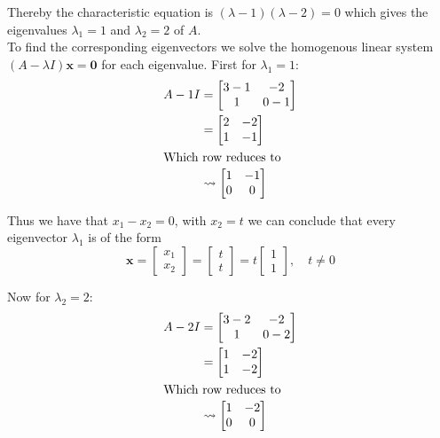 Thereby the characteristic equation is $(\lambda - 1)(\lambda - 2) = 0$ which gives the eigenvalues $\lambda_1 = 1$ and $\lambda_2 = 2$ of $A$.\\[2ex]
To find the corresponding eigenvectors we solve the homogenous linear system $(A-\lambda I)\mathbf{x}=\mathbf{0}$ for each eigenvalue. First for $\lambda_1 = 1$:
\begin{align*}
	A - 1I & = \begin{bmatrix}
		           3 - 1 & -2  \\
		           1     & 0-1
	           \end{bmatrix}               \\
	       & = \begin{bmatrix}
		           2 & -2 \\
		           1 & -1
	           \end{bmatrix}               \\
	\intertext{Which row reduces to}
	       & \rightsquigarrow\begin{bmatrix}
		                         1 & -1 \\
		                         0 & 0
	                         \end{bmatrix}
\end{align*}

Thus we have that $x_1 - x_2 = 0$, with $x_2=t$ we can conclude that every eigenvector $\lambda_1$ is of the form
\[
	\mathbf{x} = \begin{bmatrix}x_1\\x_2\end{bmatrix} = \begin{bmatrix}t\\t\end{bmatrix} = t\begin{bmatrix}1\\1\end{bmatrix}, \quad t\neq 0
\]

Now for $\lambda_2 = 2$:
\begin{align*}
	A - 2I & = \begin{bmatrix}
		           3 - 2 & -2    \\
		           1     & 0 - 2
	           \end{bmatrix}                \\
	       & = \begin{bmatrix}
		           1 & -2 \\
		           1 & -2
	           \end{bmatrix}                \\
	\intertext{Which row reduces to}
	       & \rightsquigarrow \begin{bmatrix}
		                          1 & -2 \\
		                          0 & 0
	                          \end{bmatrix}
\end{align*}

